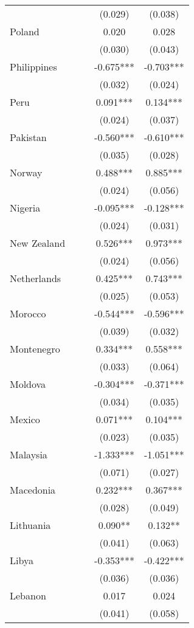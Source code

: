 \documentclass[]{article}
\begin{document}
\begin{tabular}{lcccc}
 &  &  & (0.029) & (0.038) \\
Poland &  &  & 0.020 & 0.028 \\
 &  &  & (0.030) & (0.043) \\
Philippines &  &  & -0.675*** & -0.703*** \\
 &  &  & (0.032) & (0.024) \\
Peru &  &  & 0.091*** & 0.134*** \\
 &  &  & (0.024) & (0.037) \\
Pakistan &  &  & -0.560*** & -0.610*** \\
 &  &  & (0.035) & (0.028) \\
Norway &  &  & 0.488*** & 0.885*** \\
 &  &  & (0.024) & (0.056) \\
Nigeria &  &  & -0.095*** & -0.128*** \\
 &  &  & (0.024) & (0.031) \\
New Zealand &  &  & 0.526*** & 0.973*** \\
 &  &  & (0.024) & (0.056) \\
Netherlands &  &  & 0.425*** & 0.743*** \\
 &  &  & (0.025) & (0.053) \\
Morocco &  &  & -0.544*** & -0.596*** \\
 &  &  & (0.039) & (0.032) \\
Montenegro &  &  & 0.334*** & 0.558*** \\
 &  &  & (0.033) & (0.064) \\
Moldova &  &  & -0.304*** & -0.371*** \\
 &  &  & (0.034) & (0.035) \\
Mexico &  &  & 0.071*** & 0.104*** \\
 &  &  & (0.023) & (0.035) \\
Malaysia &  &  & -1.333*** & -1.051*** \\
 &  &  & (0.071) & (0.027) \\
Macedonia &  &  & 0.232*** & 0.367*** \\
 &  &  & (0.028) & (0.049) \\
Lithuania &  &  & 0.090** & 0.132** \\
 &  &  & (0.041) & (0.063) \\
Libya &  &  & -0.353*** & -0.422*** \\
 &  &  & (0.036) & (0.036) \\
Lebanon &  &  & 0.017 & 0.024 \\
 &  &  & (0.041) & (0.058) \\

\end{tabular}
\end{document}
